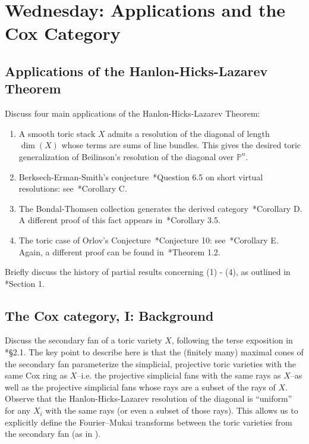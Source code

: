 \documentclass[11pt]{amsart}
\numberwithin{equation}{section}
\theoremstyle{definition}
\theoremstyle{remark}
\newcommand{\PP}{\mathbb P}
\begin{document}
\section{Wednesday: Applications and the Cox Category}
\subsection{Applications of the Hanlon-Hicks-Lazarev Theorem}
Discuss four main applications of the Hanlon-Hicks-Lazarev Theorem:
\begin{enumerate}
\item A smooth toric stack $X$ admits a resolution of the diagonal of length $\dim(X)$ whose terms are sums of line bundles. This gives the desired toric generalization of Beilinson's resolution of the diagonal over $\PP^n$. 
\item Berksech-Erman-Smith's conjecture~\cite{BES}*{Question 6.5} on short virtual resolutions: see~\cite{HHL}*{Corollary C}.
\item The Bondal-Thomsen collection generates the derived category~\cite{HHL}*{Corollary D}.  A different proof of this fact appears in~\cite{FH}*{Corollary 3.5}.
\item The toric case of Orlov's Conjecture~\cite{orlov}*{Conjecture 10}: see~\cite{HHL}*{Corollary E}. Again, a different proof can be found in~\cite{FH}*{Theorem 1.2}.
\end{enumerate}

\noindent Briefly discuss the history of partial results concerning (1) - (4), as outlined in \cite{HHL}*{Section 1}. 


\subsection{The Cox category, I: Background}
Discuss the secondary fan of a toric variety $X$, following the terse exposition in \cite{king}*{\S 2.1}. The key point to describe here is that the (finitely many) maximal cones of the secondary fan parameterize the simplicial, projective toric varieties with the same Cox ring as $X$--i.e. the projective simplicial fans with the same rays as $X$--as well as the projective simplicial fans whose rays are a subset of the rays of $X$.
Observe that the Hanlon-Hicks-Lazarev resolution of the diagonal is ``uniform'' for any $X_i$ with the same rays (or even a subset of those rays). This allows us to explicitly define the Fourier--Mukai transforms between the toric varieties from the secondary fan (as in \cite[p. 2]{king}).
\end{document}
